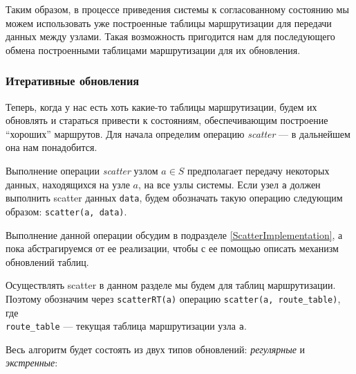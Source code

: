 Таким образом, в процессе приведения системы к согласованному состоянию мы можем использовать уже построенные таблицы маршрутизации для передачи данных между узлами. Такая возможность пригодится нам для последующего обмена построенными таблицами маршрутизации для их обновления.

\subsubsection{Итеративные обновления}
\label{IterativeUpdates}

Теперь, когда у нас есть хоть какие-то таблицы маршрутизации, будем их обновлять и стараться привести к состояниям, обеспечивающим построение \enquote{хороших} маршрутов. Для начала определим операцию \textit{scatter} --- в дальнейшем она нам понадобится.

\begin{definition}
\label{ScatterDefinition}
    Выполнение операции \textit{scatter} узлом $a \in S$ предполагает передачу некоторых данных, находящихся на узле $a$, на все узлы системы. Если узел \texttt{a} должен выполнить scatter данных \texttt{data}, будем обозначать такую операцию следующим образом: \texttt{scatter(a, data)}.
\end{definition}

Выполнение данной операции обсудим в подразделе \ref{ScatterImplementation}, а пока абстрагируемся от ее реализации, чтобы с ее помощью описать механизм обновлений таблиц.

Осуществлять scatter в данном разделе мы будем для таблиц маршрутизации. Поэтому обозначим через \texttt{scatterRT(a)} операцию \texttt{scatter(a, route\_table)}, где \\
\texttt{route\_table} --- текущая таблица маршрутизации узла \texttt{a}.

Весь алгоритм будет состоять из двух типов обновлений: \textit{регулярные} и \textit{экстренные}:

